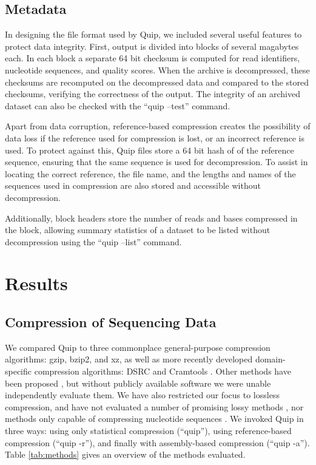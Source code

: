 \documentclass[a4,center,fleqn]{NAR}
\begin{document}
\subsection{Metadata}

In designing the file format used by Quip, we included several useful features
to protect data integrity. First, output is divided into blocks of several
magabytes each. In each block a separate 64 bit checksum is computed for read
identifiers, nucleotide sequences, and quality scores. When the archive is
decompressed, these checksums are recomputed on the decompressed data and
compared to the stored checksums, verifying the correctness of the output. The
integrity of an archived dataset can also be checked with the ``quip --test''
command.

Apart from data corruption, reference-based compression creates the
possibility of data loss if the reference used for compression is lost, or an
incorrect reference is used. To protect against this, Quip files store a 64
bit hash of of the reference sequence, ensuring that the same sequence is used
for decompression. To assist in locating the correct reference, the file name,
and the lengths and names of the sequences used in compression are also stored
and accessible without decompression.

Additionally, block headers store the number of reads and bases compressed in
the block, allowing summary statistics of a dataset to be listed without
decompression using the ``quip --list'' command.


\section{Results}

\subsection{Compression of Sequencing Data}


We compared Quip to three commonplace general-purpose compression algorithms:
gzip, bzip2, and xz, as well as more recently developed domain-specific
compression algorithms: DSRC \citep{Deorowicz2011} and Cramtools
\citep{Hsi-YangFritz2011}. Other methods have been proposed \citep{Tembe2010,
Kozanitis2011, Bhola2011}, but without publicly available software we were
unable independently evaluate them. We have also restricted our focus to
lossless compression, and have not evaluated a number of promising lossy
methods \citep{Hsi-YangFritz2011,Wan2011}, nor methods only capable
of compressing nucleotide sequences \citep{Cox2012}. We invoked Quip in three
ways: using only statistical compression (``quip''), using reference-based
compression (``quip -r''), and finally with assembly-based compression (``quip
-a''). Table \ref{tab:methods} gives an overview of the methods evaluated.
\end{document}
